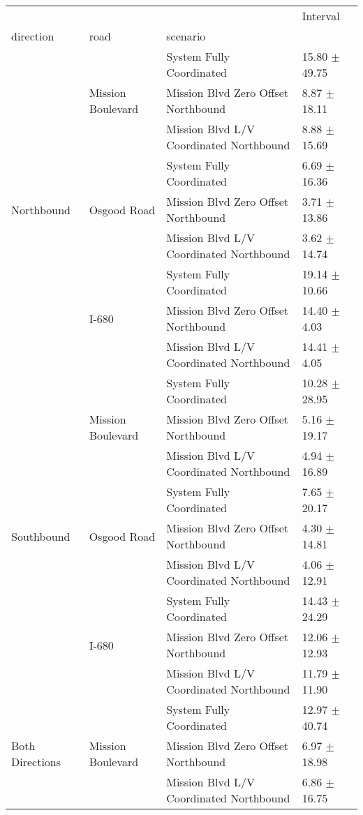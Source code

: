 \begin{tabular}{llll}
\toprule
 &  &  & Interval \\
direction & road & scenario &  \\
\midrule
\multirow[t]{9}{*}{Northbound} & \multirow[t]{3}{*}{Mission Boulevard} & System Fully Coordinated & 15.80 $\pm$ 49.75 \\
 &  & Mission Blvd Zero Offset Northbound & 8.87 $\pm$ 18.11 \\
 &  & Mission Blvd L/V Coordinated Northbound & 8.88 $\pm$ 15.69 \\
 & \multirow[t]{3}{*}{Osgood Road} & System Fully Coordinated & 6.69 $\pm$ 16.36 \\
 &  & Mission Blvd Zero Offset Northbound & 3.71 $\pm$ 13.86 \\
 &  & Mission Blvd L/V Coordinated Northbound & 3.62 $\pm$ 14.74 \\
 & \multirow[t]{3}{*}{I-680} & System Fully Coordinated & 19.14 $\pm$ 10.66 \\
 &  & Mission Blvd Zero Offset Northbound & 14.40 $\pm$ 4.03 \\
 &  & Mission Blvd L/V Coordinated Northbound & 14.41 $\pm$ 4.05 \\
\multirow[t]{9}{*}{Southbound} & \multirow[t]{3}{*}{Mission Boulevard} & System Fully Coordinated & 10.28 $\pm$ 28.95 \\
 &  & Mission Blvd Zero Offset Northbound & 5.16 $\pm$ 19.17 \\
 &  & Mission Blvd L/V Coordinated Northbound & 4.94 $\pm$ 16.89 \\
 & \multirow[t]{3}{*}{Osgood Road} & System Fully Coordinated & 7.65 $\pm$ 20.17 \\
 &  & Mission Blvd Zero Offset Northbound & 4.30 $\pm$ 14.81 \\
 &  & Mission Blvd L/V Coordinated Northbound & 4.06 $\pm$ 12.91 \\
 & \multirow[t]{3}{*}{I-680} & System Fully Coordinated & 14.43 $\pm$ 24.29 \\
 &  & Mission Blvd Zero Offset Northbound & 12.06 $\pm$ 12.93 \\
 &  & Mission Blvd L/V Coordinated Northbound & 11.79 $\pm$ 11.90 \\
\multirow[t]{9}{*}{Both Directions} & \multirow[t]{3}{*}{Mission Boulevard} & System Fully Coordinated & 12.97 $\pm$ 40.74 \\
 &  & Mission Blvd Zero Offset Northbound & 6.97 $\pm$ 18.98 \\
 &  & Mission Blvd L/V Coordinated Northbound & 6.86 $\pm$ 16.75 \\

\end{tabular}
